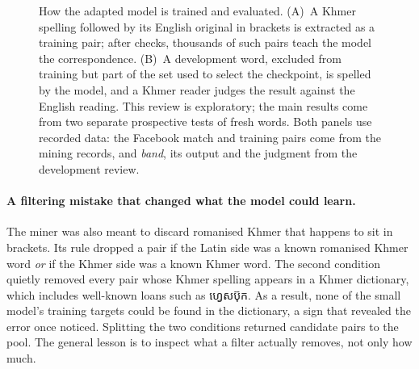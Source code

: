 \documentclass[10pt,a4paper,twocolumn]{article}
\newcommand{\km}[1]{{\khmerfont #1}}
\begin{document}
\begin{figure}[t]
\caption{How the adapted model is trained and evaluated. (A)~A Khmer spelling followed by its English original in
brackets is extracted as a training pair; after checks, thousands of such pairs teach the model the correspondence.
(B)~A development word, excluded from training but part of the set used to select the checkpoint, is spelled by
the model, and a Khmer reader judges the result against the English reading. This review is exploratory; the main
results come from two separate prospective tests of fresh words. Both panels use recorded data: the Facebook match
and training pairs come from the mining records, and \emph{band}, its output and the judgment from the
development review.}
\label{fig:pipeline}
\end{figure}

\paragraph{A filtering mistake that changed what the model could learn.}
The miner was also meant to discard romanised Khmer that happens to sit in brackets. Its rule dropped a pair if the
Latin side was a known romanised Khmer word \emph{or} if the Khmer side was a known Khmer word. The second
condition quietly removed every pair whose Khmer spelling appears in a Khmer dictionary, which includes well-known
loans such as \km{ហ្វេសប៊ុក}. As a result, none of the small model's training targets could be found in the
dictionary, a sign that revealed the error once noticed. Splitting the two conditions returned
 candidate pairs to the pool. The general lesson is to inspect what a filter actually removes,
not only how much.
\end{document}
